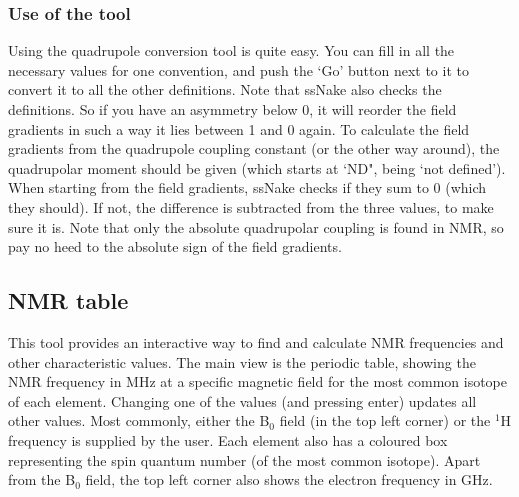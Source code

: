 \documentclass[11pt,a4paper]{article}
\begin{document}
\subsubsection*{Use of the tool}
Using the quadrupole conversion tool is quite easy. You can fill in all the necessary values for one convention, and push the `Go' button next to it to convert it to all the other definitions. Note that ssNake also checks the definitions. So if you have an asymmetry below 0, it will reorder the field gradients in such a way it lies between 1 and 0 again. To calculate the field gradients from the quadrupole coupling constant (or the other way around), the quadrupolar moment should be given (which starts at `ND", being `not defined'). When starting from the field gradients, ssNake checks if they sum to 0 (which they should). If not, the difference is subtracted from the three values, to make sure it is. Note that only the absolute quadrupolar coupling is found in NMR, so pay no heed to the absolute sign of the field gradients.


\subsection{NMR table}
This tool provides an interactive way to find and calculate NMR frequencies and other characteristic values. The main view is the periodic table, showing the NMR frequency in MHz at a specific magnetic field for the most common isotope of each element. Changing one of the values (and pressing enter) updates all other values. Most commonly, either the B$_0$ field (in the top left corner) or the $^1$H frequency is supplied by the user. Each element also has a coloured box representing the spin quantum number (of the most common isotope). Apart from the B$_0$ field, the top left corner also shows the electron frequency in GHz.
\end{document}
